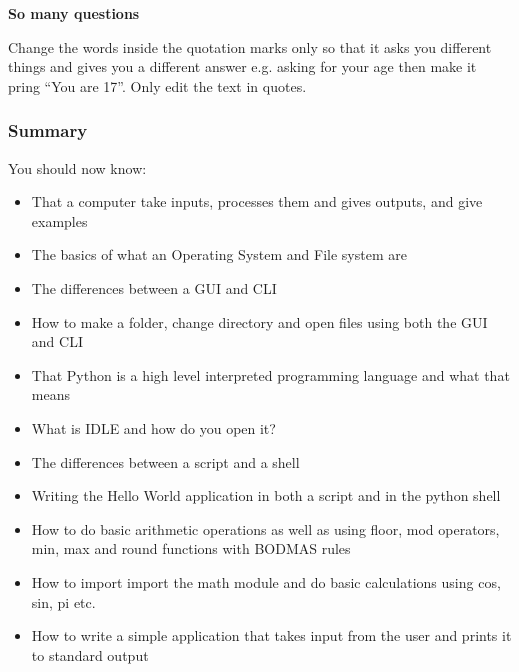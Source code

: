 \begin{exercise} \textbf{So many questions}

Change the words inside the quotation marks only so that it asks you different things and gives you a different answer e.g. asking for your age then make it pring “You are 17”. Only edit the text in quotes.
\end{exercise}

\begin{summaryBox} \subsubsection{Summary}
You should now know:
\begin{itemize}
\item That a computer take inputs, processes them and gives outputs, and give examples
\item The basics of what an Operating System and File system are
\item The differences between a GUI and CLI
\item How to make a folder, change directory and open files using both the GUI and CLI
\item That Python is a high level interpreted programming language and what that means
\item What is IDLE and how do you open it?
\item The differences between a script and a shell
\item Writing the Hello World application in both a script and in the python shell
\item How to do basic arithmetic operations as well as using floor, mod operators, min, max and round functions with BODMAS rules
\item How to import import the math module and do basic calculations using cos, sin, pi etc.
\item How to write a simple application that takes input from the user and prints it to standard output
\end{itemize}
\end{summaryBox}
%
%
%
%
